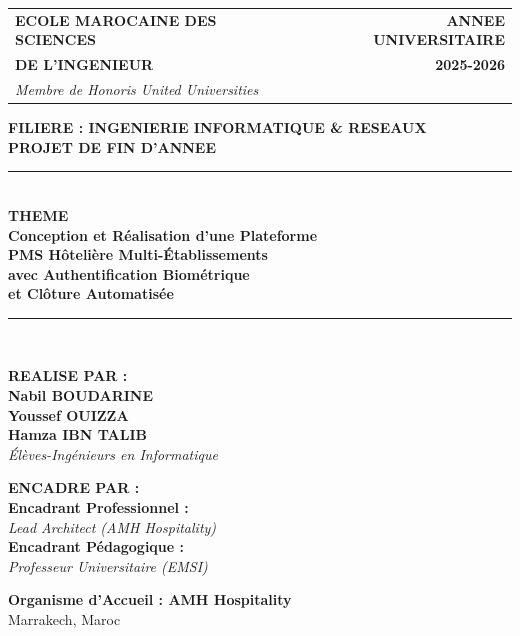 \documentclass[12pt,a4paper,oneside]{report}
\begin{document}
\begin{titlepage}
\thispagestyle{empty}
\begin{center}

\begin{tabular*}{\textwidth}{@{\extracolsep{\fill}} lr}
\textbf{ECOLE MAROCAINE DES SCIENCES} & \textbf{ANNEE UNIVERSITAIRE} \\
\textbf{DE L'INGENIEUR} & \textbf{2025-2026} \\
\textit{Membre de Honoris United Universities} & \\
\end{tabular*}

\vspace{1.5cm}

{\Large \textbf{FILIERE : INGENIERIE INFORMATIQUE \& RESEAUX}}\\[1.2cm]

{\Huge \textbf{PROJET DE FIN D'ANNEE}}\\[1cm]

\rule{\textwidth}{1.5pt}\\[0.5cm]
{\large \textbf{THEME}}\\[0.3cm]
{\LARGE \textbf{Conception et Réalisation d'une Plateforme\\PMS Hôtelière Multi-Établissements\\avec Authentification Biométrique\\et Clôture Automatisée}}\\[0.4cm]
\rule{\textwidth}{1.5pt}\\[1.5cm]

\begin{minipage}[t]{0.52\textwidth}
  \textbf{REALISE PAR :}\\[0.25cm]
  {\large \textbf{Nabil BOUDARINE}}\\[0.12cm]
  {\large \textbf{Youssef OUIZZA}}\\[0.12cm]
  {\large \textbf{Hamza IBN TALIB}}\\[0.2cm]
  \textit{Élèves-Ingénieurs en Informatique}
\end{minipage}
\hfill
\begin{minipage}[t]{0.45\textwidth}
  \raggedleft
  \textbf{ENCADRE PAR :}\\[0.25cm]
  \textbf{Encadrant Professionnel :}\\
  \textit{Lead Architect (AMH Hospitality)}\\[0.3cm]
  \textbf{Encadrant Pédagogique :}\\
  \textit{Professeur Universitaire (EMSI)}
\end{minipage}

\vfill

{\large \textbf{Organisme d'Accueil : AMH Hospitality}}\\[0.1cm]
{\normalsize Marrakech, Maroc}

\end{center}
\end{titlepage}
\end{document}
